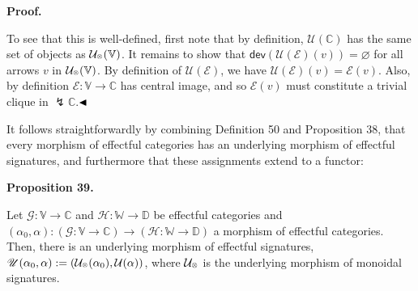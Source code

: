 \documentclass[10pt,a4paper]{article}
\begin{document}
 
  
 
 
 
 
\par\medskip\noindent\textbf{Proof.}\par
 
 
To see that this is well-defined, first note that by definition, $\mathcal{U}(\mathbb{C})$ has the same set of objects as $\mathcal{U}_{\mathbin{\raisebox{1.25pt}{$\scriptscriptstyle\otimes$}}}(\mathbb{V})$. It remains to show that $\mathsf{dev}(\mathscr{U}(\mathscr{E})(v))=\varnothing$ for all arrows $v$ in $\mathcal{U}_{\mathbin{\raisebox{1.25pt}{$\scriptscriptstyle\otimes$}}}(\mathbb{V})$. By definition of $\mathscr{U}(\mathscr{E})$, we have $\mathscr{U}(\mathscr{E})(v)=\mathscr{E}(v)$. Also, by definition $\mathscr{E}:\mathbb{V}\to\mathbb{C}$ has central image, and so $\mathscr{E}(v)$ must constitute a trivial clique in ${\lightning}\mathbb{C}$.$\hfill\blacktriangleleft$\par
 
 
 
It follows straightforwardly by combining Definition 50 and Proposition 38, that every morphism of effectful categories has an underlying morphism of effectful signatures, and furthermore that these assignments extend to a functor:\par
 
 
 
\par\medskip\noindent\textbf{Proposition 39.}\par
 
 
Let $\mathscr{G}:\mathbb{V}\to\mathbb{C}$ and $\mathscr{H}:\mathbb{W}\to\mathbb{D}$ be effectful categories and $(\alpha_{0},\alpha):(\mathscr{G}:\mathbb{V}\to\mathbb{C})\to(\mathscr{H}:\mathbb{W}\to\mathbb{D})$ a morphism of effectful categories. Then, there is an underlying morphism of effectful signatures, $\mathscr{U}(\alpha_{0},\alpha):=(\mathcal{U}_{\mathbin{\raisebox{1.25pt}{$\scriptscriptstyle\otimes$}}}(\alpha_{0}),\mathcal{U}(\alpha))$, where $\mathcal{U}_{\mathbin{\raisebox{1.25pt}{$\scriptscriptstyle\otimes$}}}$ is the underlying morphism of monoidal signatures.\par
 
\end{document}
